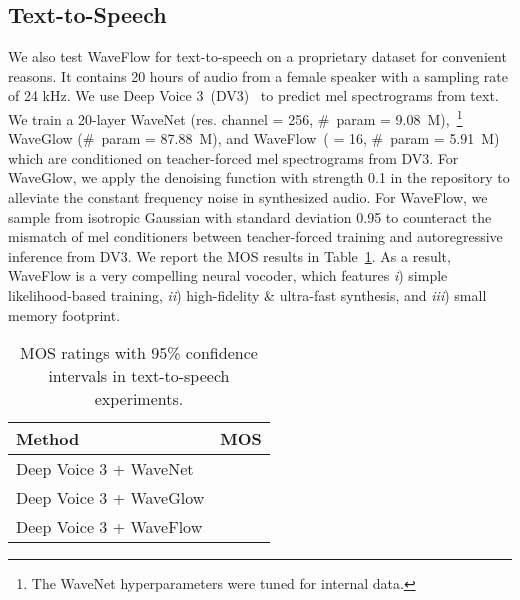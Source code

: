 \documentclass{article}
\begin{document}
\vspace{-.2em}
\subsection{Text-to-Speech}
\vspace{-.1em}
We also test WaveFlow for text-to-speech on a proprietary dataset for convenient reasons. It contains 20 hours of audio from a female speaker with a sampling rate of 24 kHz. We use Deep Voice 3~(DV3)~\citep{ping2017deep} to predict mel spectrograms from text. We train a 20-layer WaveNet (res. channel = 256, \#~param = {9.08~M}),~\footnote{The WaveNet hyperparameters were tuned for internal data.} 
WaveGlow (\#~param = {87.88~M}), and WaveFlow~( = 16, \#~param = {5.91~M}) which are conditioned on teacher-forced mel spectrograms from DV3.
For WaveGlow, we apply the denoising function with strength 0.1 in the repository to alleviate the constant frequency noise in synthesized audio.
For WaveFlow, we sample  from isotropic Gaussian with standard deviation 0.95 to counteract the mismatch of mel conditioners between teacher-forced training and autoregressive inference from DV3.
We report the MOS results in Table~\ref{tab:tts-mos}.
As a result, WaveFlow is a very compelling neural vocoder, which features \emph{i}) simple likelihood-based training, \emph{ii}) high-fidelity \& ultra-fast synthesis, and \emph{iii}) small memory footprint.

\begin{table}[t]
\centering
\vspace{-1.2em}
\caption{MOS ratings with 95\% confidence intervals in text-to-speech experiments.}
\label{tab:tts-mos}
\vspace{0.2em}
\begin{tabular}{l|c}
\hline
\textbf{ Method }  & \textbf{MOS} \\ \hline
Deep Voice 3 + WaveNet &   \\ 
Deep Voice 3 + WaveGlow  &   \\ 
Deep Voice 3 + WaveFlow  &   \\    \hline
\end{tabular}
\vspace{-1.0em}
\end{table}


\vspace{-.2em}
\end{document}
